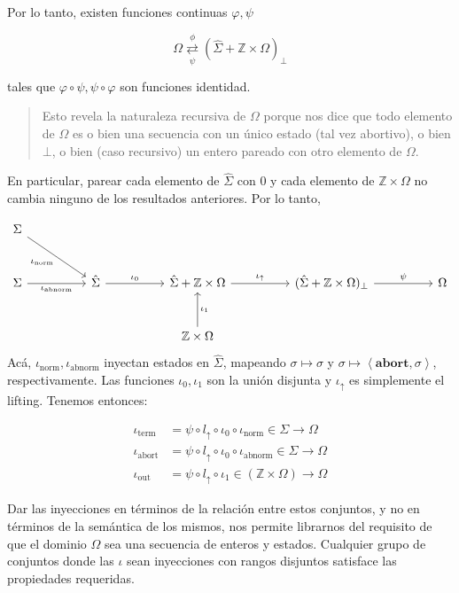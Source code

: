 \documentclass[a4paper, 12pt]{article}
\begin{document}
Por lo tanto, existen funciones continuas $\varphi, \psi$

\begin{equation*}
  \Omega 
\underset{\psi}{\overset{\phi}{\rightleftarrows}} 
\left( \hat{\Sigma} + \mathbb{Z} \times \Omega \right)_{\perp}
\end{equation*}

tales que $\varphi \circ \psi, \psi \circ \varphi$ son funciones identidad.

\begin{quote}
  Esto revela la naturaleza recursiva de $\Omega$ porque nos dice que todo
  elemento de $\Omega$ es o bien una secuencia con un único estado (tal vez
  abortivo), o bien $\bot$, o bien (caso recursivo) un entero pareado con otro
  elemento de $\Omega$.
\end{quote}

En particular, parear cada elemento de $\hat{\Sigma}$ con $0$ y cada elemento de
$\mathbb{Z} \times \Omega$ no cambia ninguno de los resultados anteriores. Por
lo tanto,

\[
\begin{tikzcd}[row sep=large, column sep=huge]
\Sigma \arrow[dr, "\iota_{\text{norm}}"'] & \\
\Sigma \arrow[r, "\iota_{\text{abnorm}}"'] & \hat{\Sigma} \arrow[r, "\iota_0"] &
\hat{\Sigma}+ \mathbb{Z} \times \Omega \arrow[r, "\iota_{\uparrow}"] & (\hat{\Sigma} + \mathbb{Z} \times \Omega)_{\perp} \arrow[r, "\psi"] & \Omega \\
& & \mathbb{Z} \times \Omega \arrow[u, "\iota_1"']
\end{tikzcd}
\]
Acá, $\iota_{\text{norm}}, \iota_{\text{abnorm}}$ inyectan estados en
$\hat{\Sigma}$, mapeando $\sigma \mapsto \sigma$ y $\sigma \mapsto
\left<\textbf{abort}, \sigma \right>$, respectivamente. Las funciones $\iota_0,
\iota_1$ son la unión disjunta y $\iota_\uparrow$ es simplemente el lifting.
Tenemos entonces:

\begin{align*}
  \iota_{\text{term}} &= \psi \circ l_{\uparrow} \circ \iota_0 \circ
  \iota_\text{norm} \in \Sigma \to \Omega \\ 
  \iota_{\text{abort}} &= \psi \circ l_{\uparrow} \circ \iota_0 \circ
  \iota_\text{abnorm} \in \Sigma \to \Omega\\
  \iota_{\text{out}} &= \psi \circ l_{\uparrow} \circ \iota_1 \in (\mathbb{Z}
  \times \Omega) \to \Omega
\end{align*}

Dar las inyecciones en términos de la relación entre estos conjuntos, y no en
términos de la semántica de los mismos, nos permite librarnos del requisito de
que el dominio $\Omega$ sea una secuencia de enteros y estados. Cualquier grupo
de conjuntos donde las $\iota$ sean inyecciones con rangos disjuntos satisface
las propiedades requeridas.
\end{document}
